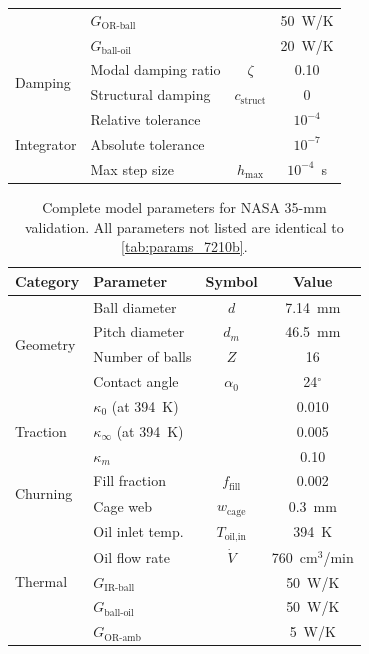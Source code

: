 \documentclass[preprint,12pt]{elsarticle}
\begin{document}
\begin{table}[htbp]
\begin{tabular}{@{}llcc@{}}
        & $G_{\text{OR-ball}}$ & & 50~W/K \\
        & $G_{\text{ball-oil}}$ & & 20~W/K \\
        \midrule
        \multirow{2}{*}{Damping}
        & Modal damping ratio & $\zeta$ & 0.10 \\
        & Structural damping & $c_{\text{struct}}$ & 0 \\
        \midrule
        \multirow{3}{*}{Integrator}
        & Relative tolerance & & $10^{-4}$ \\
        & Absolute tolerance & & $10^{-7}$ \\
        & Max step size & $h_{\max}$ & $10^{-4}$~s \\
        \bottomrule
    \end{tabular}
\end{table}

\begin{table}[htbp]
    \centering
    \caption{Complete model parameters for NASA 35-mm validation. All parameters not listed are identical to \cref{tab:params_7210b}.}
    \label{tab:params_nasa}
    \small
    \begin{tabular}{@{}llcc@{}}
        \toprule
        Category & Parameter & Symbol & Value \\
        \midrule
        \multirow{4}{*}{Geometry}
        & Ball diameter & $d$ & 7.14~mm \\
        & Pitch diameter & $d_m$ & 46.5~mm \\
        & Number of balls & $Z$ & 16 \\
        & Contact angle & $\alpha_0$ & 24$^\circ$ \\
        \midrule
        \multirow{3}{*}{Traction}
        & $\kappa_0$ (at 394~K) & & 0.010 \\
        & $\kappa_\infty$ (at 394~K) & & 0.005 \\
        & $\kappa_m$ & & 0.10 \\
        \midrule
        \multirow{2}{*}{Churning}
        & Fill fraction & $f_{\text{fill}}$ & 0.002 \\
        & Cage web & $w_{\text{cage}}$ & 0.3~mm \\
        \midrule
        \multirow{5}{*}{Thermal}
        & Oil inlet temp. & $T_{\text{oil,in}}$ & 394~K \\
        & Oil flow rate & $\dot{V}$ & 760~cm$^3$/min \\
        & $G_{\text{IR-ball}}$ & & 50~W/K \\
        & $G_{\text{ball-oil}}$ & & 50~W/K \\
        & $G_{\text{OR-amb}}$ & & 5~W/K \\
        \bottomrule
    \end{tabular}
\end{table}
\end{document}
